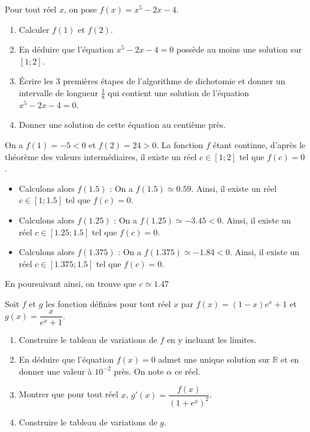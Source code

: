 \documentclass[11pt,fleqn, openany]{book} %
\begin{document}
\begin{exercise}[topic=cont03]Pour tout réel $x$, on pose $f(x)=x^5-2x-4$. 
\begin{enumerate}
\item Calculer $f(1)$ et $f(2)$.
\item En déduire que l'équation $x^5-2x-4=0$ possède au moins une solution sur $[1;2]$.
\item Écrire les 3 premières étapes de l'algorithme de dichotomie et donner un intervalle de longueur $\frac{1}{8}$ qui contient une solution de l'équation $x^5-2x-4=0$.
\item Donner une solution de cette équation au centième près.\end{enumerate}\end{exercise}

\begin{solution}
On a $f(1)=-5<0$ et $f(2)=24>0$. La fonction $f$ étant continue, d'après le théorème des valeurs intermédiaires, il existe un réel $c \in [1;2]$ tel que $f(c)=0$.

\begin{itemize}
\item Calculons alors $f(1.5)$ : On a $f(1.5)\simeq 0.59$. Ainsi, il existe un réel $c \in [1 ;1.5]$ tel que $f(c)=0$.
\item Calculons alors $f(1.25)$ : On a $f(1.25)\simeq -3.45<0$. Ainsi, il existe un réel $c \in [1.25 ;1.5]$ tel que $f(c)=0$.
\item Calculons alors $f(1.375)$ : On a $f(1.375)\simeq -1.84<0$. Ainsi, il existe un réel $c \in [1.375 ;1.5]$ tel que $f(c)=0$.
\end{itemize}
En poursuivant ainsi, on trouve que $c\simeq 1.47$
\end{solution}



\begin{exercise}[topic=cont03]Soit $f$ et $g$ les fonction définies pour tout réel $x$ par $f(x)=(1-x)e^x+1$ et $g(x)=\dfrac{x}{e^x+1}$.
\begin{enumerate}
\item Construire le tableau de variations de $f$ en y incluant les limites.
\item En déduire que l'équation $f(x)=0$ admet une unique solution sur $\mathbb{R}$ et en donner une valeur à $10^{-2}$ près. On note $\alpha$ ce réel.
\item Montrer que pour tout réel $x$, $g'(x)=\dfrac{f(x)}{(1+e^x)^2}$.
\item Construire le tableau de variations de $g$.
\end{enumerate}\end{exercise}
\end{document}
